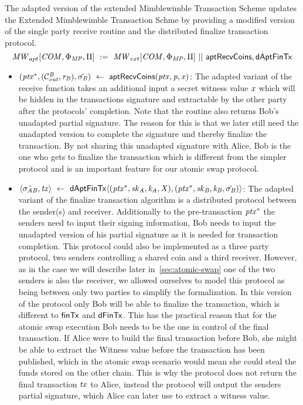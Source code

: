 \begin{definition}
    \label{def:apt-ext-mw-tx-scheme}
    The adapted version of the extended Mimblewimble Transaction Scheme updates the Extended Mimblewimble Transaction Schme by providing a modified version of the single party receive routine and the distributed finalize transaction protocol.
    \[ \mathit{MW}_{apt}[\mathit{COM},\Phi_{\mathit{MP}},\Pi] ~:=~ \mathit{MW}_{ext}[\mathit{COM},\Phi_{\mathit{MP}},\Pi] ~||~ \mathsf{aptRecvCoins}, \mathsf{dAptFinTx} \]
    \begin{itemize}
        \item $(\mathit{ptx}^*, (\mathcal{C}_{\mathit{out}}^{\mathit{B}},\mathit{r}_{\mathit{B}}), \tilde{\sigma_{\mathit{B}}}) ~\leftarrow~ \mathsf{aptRecvCoins}(\mathit{ptx},\mathit{p},\mathit{x})$: The adapted variant of the receive function takes an additional input a secret witness value
        $\mathit{x}$ which will be hidden in the transactions signature and extractable by the other party after the protocols' completion.
        Note that the routine also returns Bob's unadapted partial signature.
        The reason for this is that we later still need the unadapted version to complete the signature und thereby finalize the transaction.
        By not sharing this unadapted signature with Alice, Bob is the one who gets to finalize the transaction which is different from the simpler protocol and is an important feature for our atomic swap protocol.
        \item $\langle \tilde{\sigma_{\mathit{A}\mathit{B}}}, \mathit{tx} \rangle ~\leftarrow~ \mathsf{dAptFinTx} \langle (\mathit{ptx}^*,\mathit{sk}_{\mathit{A}},\mathit{\mathit{k}_{\mathit{A}}},\mathit{X}), (\mathit{ptx}^*,\mathit{sk}_{\mathit{B}},\mathit{\mathit{k}_{\mathit{B}}},\tilde{\sigma_{\mathit{B}}}) \rangle$: The adapted variant of the finalize transaction algorithm is a distributed protocol between the sender(s) and receiver.
        Additionally to the pre-transaction $\mathit{ptx}^*$ the senders need to input their signing information, Bob needs to input the unadapted version of his partial signature as it is needed for transaction completion.
        This protocol could also be implemented as a three party protocol, two senders controlling a shared coin and a third receiver.
        However, as in the case we will describe later in~\ref{sec:atomic-swap} one of the two senders is also the receiver, we allowed ourselves to model this protocol as being between only two parties to simplify the formalization.
        In this version of the protocol only Bob will be able to finalize the transaction, which is different to $\mathsf{finTx}$ and $\mathsf{dFinTx}$.
        This has the practical reason that for the atomic swap execution Bob needs to be the one in control of the final transaction.
        If Alice were to build the final transaction before Bob, she might be able to extract the Witness value before the transaction has been published, which in the atomic swap scenario would mean she could steal the funds stored on the other chain.
        This is why the protocol does not return the final transaction $\mathit{tx}$ to Alice, instead the protocol will output the senders partial signature, which Alice can later use to extract a witness value.
    \end{itemize}
\end{definition}

